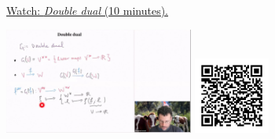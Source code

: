 
\begin{minipage}{10cm}
    \href{https://act4e-spring21.netlify.app/videos/spring2021-nat-trafos:natural-trafos:double-dual.html}{Watch: \emph{Double dual} (10 minutes).}
        
    \href{https://act4e-spring21.netlify.app/videos/spring2021-nat-trafos:natural-trafos:double-dual.html}{\includegraphics[height=3.5cm]{spring2021-nat-trafos:natural-trafos:double-dual/thumbnails.jpg}}
    \href{https://act4e-spring21.netlify.app/videos/spring2021-nat-trafos:natural-trafos:double-dual.html}{\includegraphics[height=2.5cm]{spring2021-nat-trafos:natural-trafos:double-dual/qrcode.png}}
\end{minipage}
